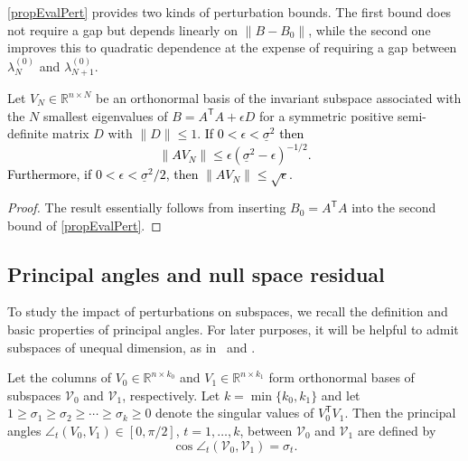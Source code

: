 \documentclass{siamart190516}
\newcommand{\Ttran}{\mathsf{T}}
\newcommand{\R}{\mathbb{R}}
\providecommand{\norm}[1]{\lVert#1\rVert}
\newcommand{\edit}[1]{\textcolor{black}{#1}} %
\begin{document}
\cref{propEvalPert} provides two kinds of perturbation bounds. The first bound does not require a gap but depends linearly on $\norm{B-B_{0}}$, while the second one improves this to quadratic dependence at the expense of requiring a gap between $\lambda_{N}^{(0)}$ and $\lambda_{N+1}^{(0)}$. 
\begin{theorem}
    \label{thmVANg}
    Let $V_{N} \in \R^{n\times N}$ be an orthonormal basis of the invariant subspace associated with the $N$ smallest eigenvalues of $B=A^{\Ttran}A+\epsilon D$ for a symmetric positive semi-definite matrix $D$ with $\norm{D}\leq 1$. 
    \edit{If $0<\epsilon<\underline{\sigma}^{2}$ then
    \begin{equation*}
        \norm{AV_{N}}\leq \epsilon (\underline{\sigma}^{2}-\epsilon)^{-1/2}.
    \end{equation*}
    Furthermore, if $0<\epsilon<\underline{\sigma}^{2}/2$, then $\norm{AV_{N}}\leq \sqrt{\epsilon}$.}

\end{theorem}
\begin{proof}
The result essentially follows from inserting $B_0 = A^{\Ttran} A$ into the second bound of \cref{propEvalPert}.
\end{proof}





\subsection{Principal angles and null space residual}
To study the impact of perturbations on subspaces, we recall the definition and basic properties of principal angles. For later purposes, it will be helpful to admit subspaces of unequal dimension, as in~\cite[Section~6.4.3]{Golub2013} and \cite{Zhu2013}. 

\begin{definition}
    \label{defPA}
    Let the columns of $V_{0}\in\R^{n\times k_{0}}$ and $V_{1}\in\R^{n\times k_{1}}$ form orthonormal bases of subspaces $\mathcal{V}_{0}$ and 
    $\mathcal{V}_{1}$, respectively. Let $k = \min\{k_{0},k_{1}\}$ and let $1 \ge \sigma_{1} \geq  \sigma_{2} \geq \dotsb \geq \sigma_{k} \geq 0$ denote the singular values of $V_{0}^{\Ttran}V_{1}$.
    Then the principal angles $\angle_{t}(V_{0},V_{1}) \in [0,\pi/2]$, $t = 1,\dotsc,k$, between $\mathcal{V}_{0}$ and $\mathcal{V}_{1}$ are defined by
    \begin{equation*}
        \cos \angle_{t}(\mathcal{V}_{0},\mathcal{V}_{1}) = \sigma_{t}.   
    \end{equation*}
\end{definition}
\end{document}

